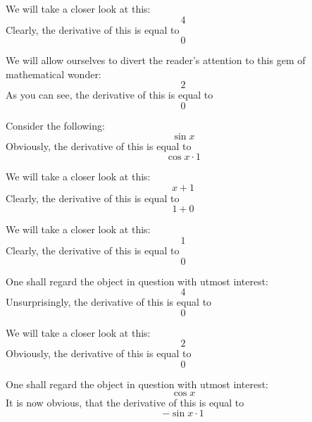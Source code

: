 \documentclass{article}
\begin{document}
We will take a closer look at this:
\begin{equation}
4 
\end{equation}
Clearly, the derivative of this is equal to
\begin{equation}
0 
\end{equation}

We will allow ourselves to divert the reader's attention to this gem of mathematical wonder:
\begin{equation}
2 
\end{equation}
As you can see, the derivative of this is equal to
\begin{equation}
0 
\end{equation}

Consider the following:
\begin{equation}
\sin x 
\end{equation}
Obviously, the derivative of this is equal to
\begin{equation}
\cos x \cdot 1 
\end{equation}

We will take a closer look at this:
\begin{equation}
x + 1 
\end{equation}
Clearly, the derivative of this is equal to
\begin{equation}
1 + 0 
\end{equation}

We will take a closer look at this:
\begin{equation}
1 
\end{equation}
Clearly, the derivative of this is equal to
\begin{equation}
0 
\end{equation}

One shall regard the object in question with utmost interest:
\begin{equation}
4 
\end{equation}
Unsurprisingly, the derivative of this is equal to
\begin{equation}
0 
\end{equation}

We will take a closer look at this:
\begin{equation}
2 
\end{equation}
Obviously, the derivative of this is equal to
\begin{equation}
0 
\end{equation}

One shall regard the object in question with utmost interest:
\begin{equation}
\cos x 
\end{equation}
It is now obvious, that the derivative of this is equal to
\begin{equation}
-\sin x \cdot 1 
\end{equation}
\end{document}
